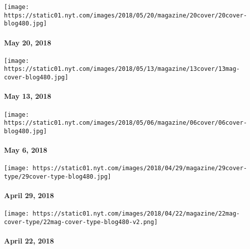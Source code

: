 \href{https://www.nytimes.com/issue/magazine/2018/05/25/052018-issue}{}

\texttt{[image: https://static01.nyt.com/images/2018/05/20/magazine/20cover/20cover-blog480.jpg]}

\hypertarget{may-20-2018}{%
\paragraph{May 20, 2018}\label{may-20-2018}}

\href{https://www.nytimes.com/issue/magazine/2018/05/25/51318-issue}{}

\texttt{[image: https://static01.nyt.com/images/2018/05/13/magazine/13cover/13mag-cover-blog480.jpg]}

\hypertarget{may-13-2018}{%
\paragraph{May 13, 2018}\label{may-13-2018}}

\href{https://www.nytimes.com/issue/magazine/2018/05/11/5618-issue}{}

\texttt{[image: https://static01.nyt.com/images/2018/05/06/magazine/06cover/06cover-blog480.jpg]}

\hypertarget{may-6-2018}{%
\paragraph{May 6, 2018}\label{may-6-2018}}

\href{https://www.nytimes.com/issue/magazine/2018/05/04/42918-issue}{}

\texttt{[image: https://static01.nyt.com/images/2018/04/29/magazine/29cover-type/29cover-type-blog480.jpg]}

\hypertarget{april-29-2018}{%
\paragraph{April 29, 2018}\label{april-29-2018}}

\href{https://www.nytimes.com/issue/magazine/2018/05/04/42218-issue}{}

\texttt{[image: https://static01.nyt.com/images/2018/04/22/magazine/22mag-cover-type/22mag-cover-type-blog480-v2.png]}

\hypertarget{april-22-2018}{%
\paragraph{April 22, 2018}\label{april-22-2018}}

